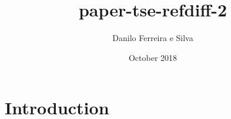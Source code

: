 \documentclass{article}
\title{paper-tse-refdiff-2}
\author{Danilo Ferreira e Silva}
\date{October 2018}
\begin{document}
\maketitle

\section{Introduction}
\end{document}
